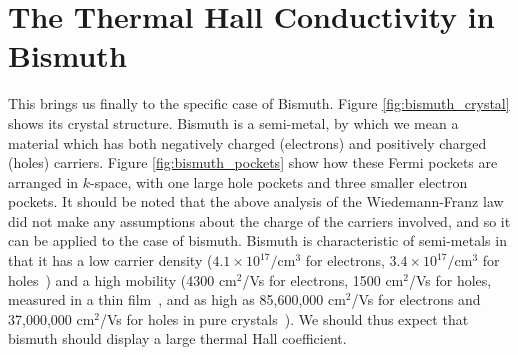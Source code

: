 \documentclass{thesis-umich}
\begin{document}
\section{The Thermal Hall Conductivity in Bismuth}

This brings us finally to the specific case of Bismuth. Figure
\ref{fig:bismuth_crystal} shows its crystal structure. Bismuth is a
semi-metal, by which we mean a material which has both negatively charged
(electrons) and positively charged (holes) carriers. Figure \ref{fig:bismuth_pockets} show how these Fermi pockets are arranged in $k$-space, with one large hole pockets and three smaller electron pockets. It should be noted that
the above analysis of the Wiedemann-Franz law did not make any assumptions
about the charge of the carriers involved, and so it can be applied to the case
of bismuth. Bismuth is characteristic of semi-metals in that it has a low
carrier density ($4.1 \times 10^{17} /$cm$^3$ for electrons, $3.4 \times
10^{17} /$cm$^3$ for holes~\cite{Jain1962}) and a high mobility (4300 cm$^2$/Vs
for electrons, 1500 cm$^2$/Vs for holes, measured in a thin
film~\cite{Rosenbaum2004}, and as high as 85,600,000 cm$^2$/Vs for electrons
and 37,000,000 cm$^2$/Vs for holes in pure crystals~\cite{Gallo1963}). We
should thus expect that bismuth should display a large thermal Hall coefficient.
\end{document}
